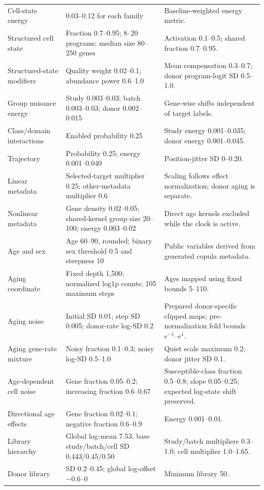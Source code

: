 \begin{longtable}{p{}p{}p{}}
Cell-state energy & 0.03--0.12 for each family & Baseline-weighted energy metric. \\
Structured cell state & Fraction 0.7--0.95; 8--20 programs; median size 80--250 genes & Activation 0.1--0.5; shared fraction 0.7--0.95. \\
Structured-state modifiers & Quality weight 0.02--0.1; abundance power 0.6--1.0 & Mean compensation 0.3--0.7; donor program-logit SD 0.5--1.0. \\
Group nuisance energy & Study 0.003--0.03; batch 0.003--0.03; donor 0.002--0.015 & Gene-wise shifts independent of target labels. \\
Class/domain interactions & Enabled probability 0.25 & Study energy 0.001--0.035; donor energy 0.001--0.045. \\
Trajectory & Probability 0.25; energy 0.001--0.040 & Position-jitter SD 0--0.20. \\
Linear metadata & Selected-target multiplier 0.25; other-metadata multiplier 0.6 & Scaling follows effect normalization; donor aging is separate. \\
Nonlinear metadata & Gene density 0.02--0.05; shared-kernel group size 20--100; energy 0.003--0.02 & Direct age kernels excluded while the clock is active. \\
Age and sex & Age 60--90, rounded; binary sex threshold 0.5 and steepness 10 & Public variables derived from generated copula metadata. \\
Aging coordinate & Fixed depth 1,500; normalized log1p counts; 105 maximum steps & Ages mapped using fixed bounds 5--110. \\
Aging noise & Initial SD 0.01; step SD 0.005; donor-rate log-SD 0.2 & Prepared donor-specific clipped maps; pre-normalization fold bounds $e^{-1}$--$e^1$. \\
Aging gene-rate mixture & Noisy fraction 0.1--0.3; noisy log-SD 0.5--1.0 & Quiet scale maximum 0.2; donor jitter SD 0.1. \\
Age-dependent cell noise & Gene fraction 0.05--0.2; increasing fraction 0.6--0.67 & Susceptible-class fraction 0.5--0.8; slope 0.05--0.25; expected log-state shift preserved. \\
Directional age effects & Gene fraction 0.02--0.1; negative fraction 0.6--0.9 & Energy 0.001--0.01. \\
Library hierarchy & Global log-mean 7.53; base study/batch/cell SD 0.443/0.45/0.50 & Study/batch multipliers 0.3--1.0; cell multiplier 1.0--1.65. \\
Donor library & SD 0.2--0.45; global log-offset $-0.6$--0 & Minimum library 50. \\

\end{longtable}
